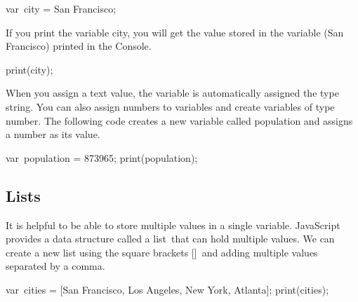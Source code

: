\documentclass[
  letterpaper,
  DIV=11,
  numbers=noendperiod]{scrreprt}
\newenvironment{Shaded}{\begin{snugshade}}{\end{snugshade}}
\newcommand{\DecValTok}[1]{\textcolor[rgb]{0.68,0.00,0.00}{#1}}
\newcommand{\FunctionTok}[1]{\textcolor[rgb]{0.28,0.35,0.67}{#1}}
\newcommand{\NormalTok}[1]{\textcolor[rgb]{0.00,0.23,0.31}{#1}}
\newcommand{\OperatorTok}[1]{\textcolor[rgb]{0.37,0.37,0.37}{#1}}
\newcommand{\StringTok}[1]{\textcolor[rgb]{0.13,0.47,0.30}{#1}}
\begin{document}
\begin{Shaded}
\begin{Highlighting}[]
\NormalTok{var city }\OperatorTok{=} \StringTok{\textquotesingle{}San Francisco\textquotesingle{}}\OperatorTok{;}
\end{Highlighting}
\end{Shaded}

If you print the variable city, you will get the value stored in the
variable (San Francisco) printed in the Console.~

\begin{Shaded}
\begin{Highlighting}[]
\FunctionTok{print}\NormalTok{(city)}\OperatorTok{;}
\end{Highlighting}
\end{Shaded}

When you assign a text value, the variable is automatically assigned the
type string. You can also assign numbers to variables and create
variables of type number. The following code creates a new variable
called population and assigns a number as its value.

\begin{Shaded}
\begin{Highlighting}[]
\NormalTok{var population }\OperatorTok{=} \DecValTok{873965}\OperatorTok{;}  
\FunctionTok{print}\NormalTok{(population)}\OperatorTok{;}
\end{Highlighting}
\end{Shaded}

\hypertarget{lists}{%
\subsection*{Lists}\label{lists}}

It is helpful to be able to store multiple values in a single variable.
JavaScript provides a data structure called a list~that can hold
multiple values. We can create a new list using the square brackets
{[}{]}~and adding multiple values separated by a comma.

\begin{Shaded}
\begin{Highlighting}[]
\NormalTok{var cities }\OperatorTok{=}\NormalTok{ [}\StringTok{\textquotesingle{}San Francisco\textquotesingle{}}\OperatorTok{,} \StringTok{\textquotesingle{}Los Angeles\textquotesingle{}}\OperatorTok{,} \StringTok{\textquotesingle{}New York\textquotesingle{}}\OperatorTok{,} \StringTok{\textquotesingle{}Atlanta\textquotesingle{}}\NormalTok{]}\OperatorTok{;} 
\FunctionTok{print}\NormalTok{(cities)}\OperatorTok{;}
\end{Highlighting}
\end{Shaded}
\end{document}
